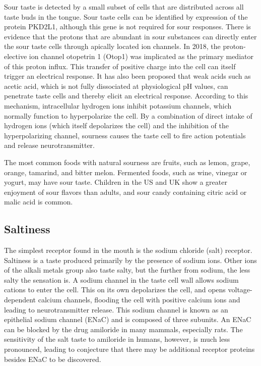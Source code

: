 Sour taste is detected by a small subset of cells that are distributed across all taste buds in the tongue. Sour taste cells can be identified by expression of the protein PKD2L1, although this gene is not required for sour responses. There is evidence that the protons that are abundant in sour substances can directly enter the sour taste cells through apically located ion channels. In 2018, the proton-elective ion channel otopetrin 1 (Otop1) was implicated as the primary mediator of this proton influx. This transfer of positive charge into the cell can itself trigger an electrical response. It has also been proposed that weak acids such as acetic acid, which is not fully dissociated at physiological pH values, can penetrate taste cells and thereby elicit an electrical response. According to this mechanism, intracellular hydrogen ions inhibit potassium channels, which normally function to hyperpolarize the cell. By a combination of direct intake of hydrogen ions (which itself depolarizes the cell) and the inhibition of the hyperpolarizing channel, sourness causes the taste cell to fire action potentials and release neurotransmitter.

The most common foods with natural sourness are fruits, such as lemon, grape, orange, tamarind, and bitter melon. Fermented foods, such as wine, vinegar or yogurt, may have sour taste. Children in the US and UK show a greater enjoyment of sour flavors than adults, and sour candy containing citric acid or malic acid is common.

\hypertarget{saltiness}{%
\subsection{Saltiness}\label{saltiness}}

The simplest receptor found in the mouth is the sodium chloride (salt) receptor. Saltiness is a taste produced primarily by the presence of sodium ions. Other ions of the alkali metals group also taste salty, but the further from sodium, the less salty the sensation is. A sodium channel in the taste cell wall allows sodium cations to enter the cell. This on its own depolarizes the cell, and opens voltage-dependent calcium channels, flooding the cell with positive calcium ions and leading to neurotransmitter release. This sodium channel is known as an epithelial sodium channel (ENaC) and is composed of three subunits. An ENaC can be blocked by the drug amiloride in many mammals, especially rats. The sensitivity of the salt taste to amiloride in humans, however, is much less pronounced, leading to conjecture that there may be additional receptor proteins besides ENaC to be discovered.

